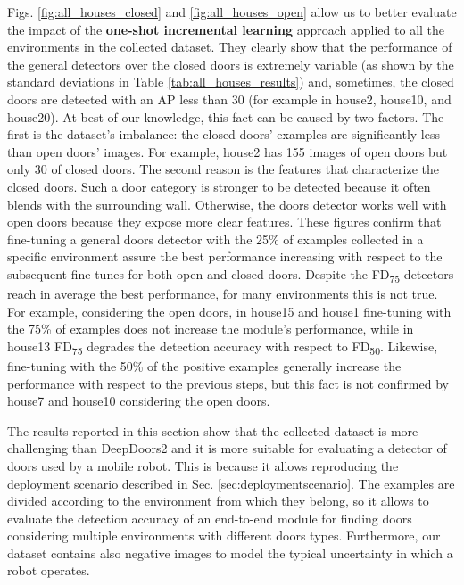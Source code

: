 Figs. \ref{fig:all_houses_closed} and \ref{fig:all_houses_open} allow us to better evaluate the impact of the \textbf{one-shot incremental learning} approach applied to all the environments in the collected dataset. They clearly show that the performance of the general detectors over the closed doors is extremely variable (as shown by the standard deviations in Table \ref{tab:all_houses_results}) and, sometimes, the closed doors are detected with an AP less than 30 (for example in \textsf{house2}, \textsf{house10}, and \textsf{house20}). At best of our knowledge, this fact can be caused by two factors. The first is the dataset's imbalance: the closed doors' examples are significantly less than open doors' images. For example, \textsf{house2} has 155 images of open doors but only 30 of closed doors. The second reason is the features that characterize the closed doors. Such a door category is stronger to be detected because it often blends with the surrounding wall. Otherwise, the doors detector works well with open doors because they expose more clear features. These figures confirm that fine-tuning a general doors detector with the 25\% of examples collected in a specific environment assure the best performance increasing with respect to the subsequent fine-tunes for both open and closed doors. Despite the \textsf{FD\textsubscript{75}} detectors reach in average the best performance, for many environments this is not true. For example, considering the open doors, in \textsf{house15} and \textsf{house1} fine-tuning with the 75\% of examples does not increase the module's performance, while in \textsf{house13} \textsf{FD\textsubscript{75}} degrades the detection accuracy with respect to \textsf{FD\textsubscript{50}}. Likewise, fine-tuning with the 50\% of the positive examples generally increase the performance with respect to the previous steps, but this fact is not confirmed by \textsf{house7} and \textsf{house10} considering the open doors.

The results reported in this section show that the collected dataset is more challenging than DeepDoors2 \cite{deepdoors2} and it is more suitable for evaluating a detector of doors used by a mobile robot. This is because it allows reproducing the deployment scenario described in Sec. \ref{sec:deploymentscenario}. The examples are divided according to the environment from which they belong, so it allows to evaluate the detection accuracy of an end-to-end module for finding doors considering multiple environments with different doors types. Furthermore, our dataset contains also negative images to model the typical uncertainty in which a robot operates. 

